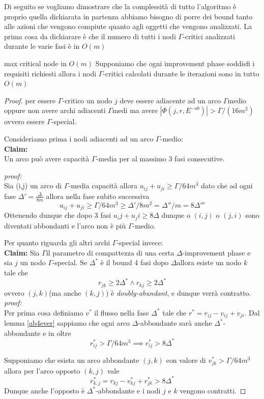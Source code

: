 \documentclass[a4paper, 11pt]{report}
\newcommand{\dlt}{$\Delta$}
\newcommand{\gmm}{$\Gamma$}
\begin{document}
Di seguito se vogliamo dimostrare che la complessità di tutto l'algoritmo è proprio quella dichiarata in partenza abbiamo bisogno di porre dei bound tanto alle azioni che vengono compiute quanto agli oggetti che vengono analizzati.
La prima cosa da dichiarare è che il numero di tutti i nodi \gmm-critici analizzati durante le varie fasi è in $O(m)$
\begin{theo}[label = maxM]{max critical node in $O(m)$}{}
    Supponiamo che ogni improvement phase soddisfi i requisiti richiesti allora  i nodi \gmm-critici calcolati durante le iterazioni sono in tutto $O(m)$
\end{theo}
\begin{proof}
    per essere \gmm-critico un nodo $j$ deve essere adiacente ad un arco \gmm medio oppure non avere archi adiacenti \gmm medi ma avere $|\Phi (j, r, E^{-ab})| > \Gamma/(16m^2)$ ovvero essere \gmm-special.

    Consideriamo prima i nodi adiacenti ad un arco \gmm-medio:\\
    \textbf{Claim:}\\
    Un arco può avere capacità \gmm-media per al massimo 3 fasi consecutive.

    \textit{proof:}\\
    Sia (i,j) un arco di \gmm-media capacità allora $u_{ij} + u_{ji} \ge \Gamma/64m^3$ dato che ad ogni fase $\Delta' = \frac{\Delta}{8m}$
    allora nella fase subito successiva  \[u_{ij} + u_{ji} \ge \Gamma/64m^3 \ge \Delta'/8m^2 =\Delta''/m = 8\Delta''' \]
    Ottenendo dunque che dopo 3 fasi $u_ij+u_ji \ge 8\Delta$ dunque o $(i,j)$ o $(j,i)$ sono diventati abbondanti e l'arco non è più \gmm-medio.

    Per quanto riguarda gli altri archi \gmm-special invece:\\
    \textbf{Claim:}
    Sia \gmm il parametro di compattezza di una certa \dlt-improvement phase e sia $j$ un nodo \gmm-special.
    Se $\Delta^*$ è il bound 4 fasi dopo \dlt allora esiste un nodo $k$ tale che 
    \[r_{jk}\ge 2\Delta^*\land r_{kj}\ge 2\Delta^* \] 
    ovvero $(j,k)$(ma anche $(k,j)$) è \textit{doubly-abundant}, e dunque verrà contratto.
    \textit{proof:}\\
    Per prima cosa definiamo $v^*$ il flusso nella fase $\Delta^*$ tale che $r^* = r_{ij}-v_{ij}+v_{ji}$.
    Dal lemma \ref{ab4ever} sappiamo che ogni arco \dlt-abbondante sarà anche $\Delta^*$-abbondante e in oltre
    \[r_{ij}^* > \Gamma/64m^3 \implies r_{ij}^*> 8\Delta^*\]

    Supponiamo che esista un arco abbondante $(j,k)$ con valore di $v_{jk}^*>\Gamma/64m^3$ allora per l'arco opposto $(k,j)$ vale
    \[r^*_{k,j}= r_{kj}-v^*_{kj}+r^*_{jk}> 8\Delta^*\]
    Dunque anche l'opposto è $\Delta^*$-abbondante e i nodi $j$ e $k$ vengono contratti.


\end{proof}
\end{document}
